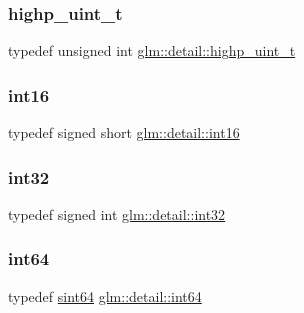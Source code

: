 \mbox{\label{namespaceglm_1_1detail_a994c05c8a976cc902a7cd193ad36bbba}} 
\subsubsection{\texorpdfstring{highp\+\_\+uint\+\_\+t}{highp\_uint\_t}}
{\footnotesize\ttfamily typedef unsigned int \hyperlink{namespaceglm_1_1detail_a994c05c8a976cc902a7cd193ad36bbba}{glm\+::detail\+::highp\+\_\+uint\+\_\+t}}

\mbox{\label{namespaceglm_1_1detail_a375938874ca4f0a0982ec6373b56117b}} 
\subsubsection{\texorpdfstring{int16}{int16}}
{\footnotesize\ttfamily typedef signed short \hyperlink{namespaceglm_1_1detail_a375938874ca4f0a0982ec6373b56117b}{glm\+::detail\+::int16}}

\mbox{\label{namespaceglm_1_1detail_a9f85b4efeca416cdcec2fd08939a2e17}} 
\subsubsection{\texorpdfstring{int32}{int32}}
{\footnotesize\ttfamily typedef signed int \hyperlink{namespaceglm_1_1detail_a9f85b4efeca416cdcec2fd08939a2e17}{glm\+::detail\+::int32}}

\mbox{\label{namespaceglm_1_1detail_a5b1c3227ec636c24a0676746381adfc8}} 
\subsubsection{\texorpdfstring{int64}{int64}}
{\footnotesize\ttfamily typedef \hyperlink{namespaceglm_1_1detail_aa9fd5478f3e347aa0b2d1a8bf3408544}{sint64} \hyperlink{namespaceglm_1_1detail_a5b1c3227ec636c24a0676746381adfc8}{glm\+::detail\+::int64}}

